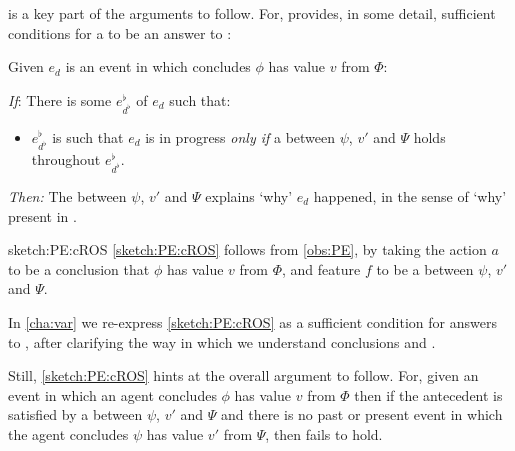 \begin{note}
   is a key part of the arguments to follow.
  For,  provides, in some detail, sufficient conditions for a \ros{} to be an answer to \qWhy{}:

  \begin{sketch}%
    \label{sketch:PE:cROS}%
    Given \(e_{d}\) is an event in which \vAgent{} concludes \(\phi\) has value \(v\) from \(\Phi\):

    \begin{itenum}
    \item[\emph{If}:]
      There is some \se{} \(e^{\flat}_{d^{\flat}}\) of \(e_{d}\) such that:
      \begin{itemize}
      \item
        \(e^{\flat}_{d^{\flat}}\) is such that \(e_{d}\) is in progress \emph{only if} a \ros{} between \(\psi\), \(v'\) and \(\Psi\) holds throughout \(e^{\flat}_{d^{\flat}}\).
      \end{itemize}
    \item[\emph{Then:}]
      The \ros{} between \(\psi\), \(v'\) and \(\Psi\) explains `why' \(e_{d}\) happened, in the sense of `why' present in \qWhy{}.
    \end{itenum}
    \vspace{-\baselineskip}
  \end{sketch}

  \begin{motivation}{sketch:PE:cROS}
    \autoref{sketch:PE:cROS} follows from \autoref{obs:PE}, by taking the  action \(a\) to be a conclusion that \(\phi\) has value \(v\) from \(\Phi\), and feature \(f\) to be a \ros{} between \(\psi\), \(v'\) and \(\Psi\).
  \end{motivation}

  \noindent%
  In \autoref{cha:var} we re-express \autoref{sketch:PE:cROS} as a sufficient condition for answers to \qWhy{}, after clarifying the way in which we understand conclusions and \ros{}.

  Still, \autoref{sketch:PE:cROS} hints at the overall argument to follow.
  For, given an event in which an agent concludes \(\phi\) has value \(v\) from \(\Phi\) then if the antecedent is satisfied by a \ros{} between \(\psi\), \(v'\) and \(\Psi\) and there is no past or present event in which the agent concludes \(\psi\) has value \(v'\) from \(\Psi\), then \issueInclusion{} fails to hold.
\end{note}



